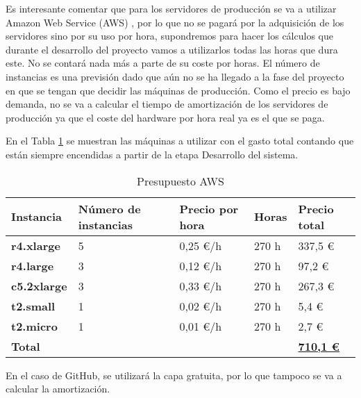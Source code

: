 Es interesante comentar que para los servidores de producción se va a utilizar Amazon Web Service (AWS) \cite{Tfg:aws}, por lo que no se pagará por la adquisición de los servidores sino por su uso por hora, supondremos para hacer los cálculos que durante el desarrollo del proyecto vamos a utilizarlos todas las horas que dura este. No se contará nada más a parte de su coste por horas. El número de instancias es una previsión dado que aún no se ha llegado a la fase del proyecto en que se tengan que decidir las máquinas de producción. Como el precio es bajo demanda, no se va a calcular el tiempo de amortización de los servidores de producción ya que el coste del hardware por hora real ya es el que se paga. 

En el Tabla \ref{tab:prepaws} se muestran las máquinas a utilizar con el gasto total contando que están siempre encendidas a partir de la etapa Desarrollo del sistema.

\begin{table}[H]\label{tab:prepaws}
	\centering
	\begin{tabular}{|l|l|l|l|l|}
		\hline
		\textbf{Instancia}  & \textbf{Número de instancias} & \textbf{Precio por hora} & \textbf{Horas} & \textbf{Precio total} \\ \hline
		\textbf{r4.xlarge}  & 5                             & 0,25 €/h \cite{Tfg:ec2price} & 270 h          & 337,5 €               \\ \hline
		\textbf{r4.large}   & 3                             & 0,12 €/h \cite{Tfg:ec2price} & 270 h          & 97,2 €                \\ \hline
		\textbf{c5.2xlarge} & 3                             & 0,33 €/h \cite{Tfg:ec2price} & 270 h          & 267,3 €               \\ \hline
		\textbf{t2.small}   & 1                             & 0,02 €/h \cite{Tfg:ec2price} & 270 h          & 5,4 €                 \\ \hline
		\textbf{t2.micro}   & 1                             & 0,01 €/h \cite{Tfg:ec2price} & 270 h          & 2,7 €                 \\ \hline
		\multicolumn{4}{|l|}{\textbf{Total}} & \textbf{\underline{710,1 €}}                                                   \\ \hline
	\end{tabular}
	\caption{Presupuesto AWS}
\end{table}

En el caso de GitHub, se utilizará la capa gratuita, por lo que tampoco se va a calcular la amortización.

